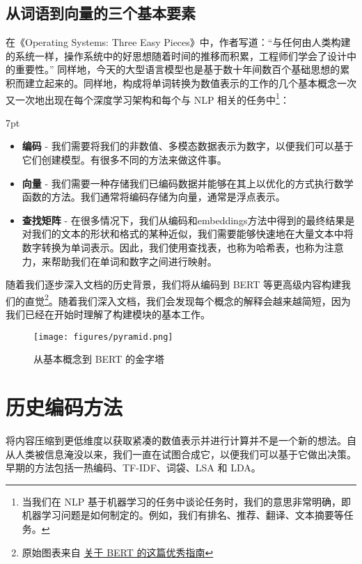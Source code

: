 \documentclass[Chinese, 11pt, table]{diazessay} %
\newenvironment{formal}{%
  \def\FrameCommand{%
	\hspace{1pt}%
	{\color{w_lightblue}\vrule width 2pt}%
	{\color{formalshade}\vrule width 4pt}%
	\colorbox{formalshade}%
  }%
  \MakeFramed{\advance\hsize-\width\FrameRestore}%
  \noindent\hspace{-4.55pt}%
  \begin{adjustwidth}{}{7pt}%
  \vspace{2pt}\vspace{2pt}%
}
{%
  \vspace{2pt}\end{adjustwidth}\endMakeFramed%
}
\begin{document}
\begin{CJK}{UTF8}{gbsn}
\begin{sloppypar}
\subsection{从词语到向量的三个基本要素}
在《Operating Systems: Three Easy Pieces》中，作者写道：“与任何由人类构建的系统一样，操作系统中的好思想随着时间的推移而积累，工程师们学会了设计中的重要性。” \citep{arpaci2018operating} 同样地，今天的大型语言模型也是基于数十年间数百个基础思想的累积而建立起来的。同样地，构成将单词转换为数值表示的工作的几个基本概念一次又一次地出现在每个深度学习架构和每个与 NLP 相关的任务中\footnote{当我们在 NLP 基于机器学习的任务中谈论任务时，我们的意思非常明确，即机器学习问题是如何制定的。例如，我们有排名、推荐、翻译、文本摘要等任务。}：

\begin{formal}
\begin{itemize}
  \item \textbf{编码} - 我们需要将我们的非数值、多模态数据表示为数字，以便我们可以基于它们创建模型。有很多不同的方法来做这件事。
  \item \textbf{向量} - 我们需要一种存储我们已编码数据并能够在其上以优化的方式执行数学函数的方法。我们通常将编码存储为向量，通常是浮点表示。
  \item \textbf{查找矩阵} - 在很多情况下，我们从编码和embeddings方法中得到的最终结果是对我们的文本的形状和格式的某种近似，我们需要能够快速地在大量文本中将数字转换为单词表示。因此，我们使用查找表，也称为哈希表，也称为注意力，来帮助我们在单词和数字之间进行映射。
\end{itemize}
\end{formal}

随着我们逐步深入文档的历史背景，我们将从编码到 BERT 等更高级内容构建我们的直觉\footnote{原始图表来自 \href{http://mccormickml.com/2019/11/11/bert-research-ep-1-key-concepts-and-sources/}{关于 BERT 的这篇优秀指南}}。随着我们深入文档，我们会发现每个概念的解释会越来越简短，因为我们已经在开始时理解了构建模块的基本工作。

\begin{figure}[H]
\centering
\texttt{[image: figures/pyramid.png]}
\caption{从基本概念到 BERT 的金字塔}
\end{figure}

\section{历史编码方法}

将内容压缩到更低维度以获取紧凑的数值表示并进行计算并不是一个新的想法。自从人类被信息淹没以来，我们一直在试图合成它，以便我们可以基于它做出决策。早期的方法包括一热编码、TF-IDF、词袋、LSA 和 LDA。


\end{sloppypar}
\end{CJK}
\end{document}
